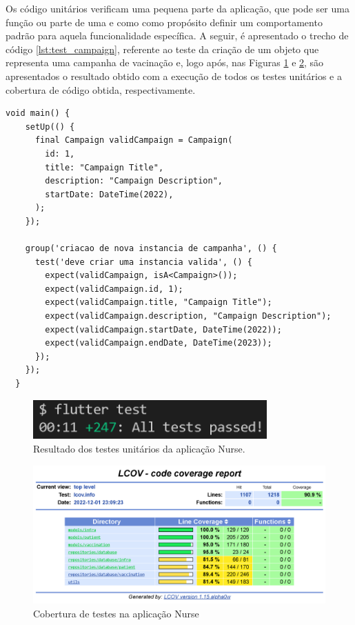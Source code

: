 Os código unitários \cite{flutter-testing} \cite{martin2011codigo} verificam uma pequena parte da aplicação, que pode ser uma função ou parte de uma e como como propósito definir um comportamento padrão para aquela funcionalidade específica. A seguir, é apresentado o trecho de código \ref{lst:test_campaign}, referente ao teste da criação de um objeto que representa uma campanha de vacinação e, logo após, nas Figuras \ref{fig:tests_result} e \ref{fig:tests_coverage}, são apresentados o resultado obtido com a execução de todos os testes unitários e a cobertura de código obtida, respectivamente.

\begin{lstlisting}[caption={Teste unitário para verificação da correta criação de uma instância de \textbf{\textit{Campaign}}}, label={lst:test_campaign}]
  void main() {  
    setUp(() {
      final Campaign validCampaign = Campaign(
        id: 1,
        title: "Campaign Title",
        description: "Campaign Description",
        startDate: DateTime(2022),
      );
    });
  
    group('criacao de nova instancia de campanha', () {
      test('deve criar uma instancia valida', () {
        expect(validCampaign, isA<Campaign>());
        expect(validCampaign.id, 1);
        expect(validCampaign.title, "Campaign Title");
        expect(validCampaign.description, "Campaign Description");
        expect(validCampaign.startDate, DateTime(2022));
        expect(validCampaign.endDate, DateTime(2023));
      });
    });
  }
\end{lstlisting}

\begin{figure}[!ht]
  \centering
  \includegraphics[width=0.8\textwidth]{figuras/cap5/5_tests_result.png}
  \caption{Resultado dos testes unitários da aplicação Nurse.}
  \label{fig:tests_result}
\end{figure}

\begin{figure}[!ht]
  \centering
  \includegraphics[width=\textwidth]{figuras/cap5/5_coverage_report.png}
  \caption{Cobertura de testes na aplicação Nurse}
  \label{fig:tests_coverage}
\end{figure}

